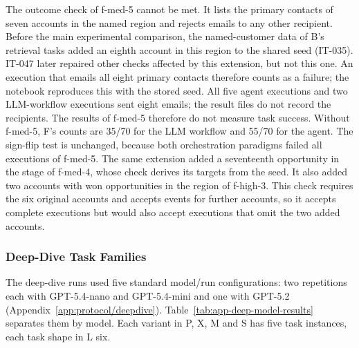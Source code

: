 The outcome check of f-med-5 cannot be met. It lists the primary contacts of seven accounts in the named region and rejects emails to any other recipient. Before the main experimental comparison, the named-customer data of B's retrieval tasks added an eighth account in this region to the shared seed (IT-035). IT-047 later repaired other checks affected by this extension, but not this one. An execution that emails all eight primary contacts therefore counts as a failure; the notebook reproduces this with the stored seed. All five agent executions and two LLM-workflow executions sent eight emails; the result files do not record the recipients. The results of f-med-5 therefore do not measure task success. Without f-med-5, F's counts are 35/70 for the LLM workflow and 55/70 for the agent. The sign-flip test is unchanged, because both orchestration paradigms failed all executions of f-med-5. The same extension added a seventeenth opportunity in the stage of f-med-4, whose check derives its targets from the seed. It also added two accounts with won opportunities in the region of f-high-3. This check requires the six original accounts and accepts events for further accounts, so it accepts complete executions but would also accept executions that omit the two added accounts.
\FloatBarrier

\subsubsection{Deep-Dive Task Families}
\label{app:results/deepdive}

The deep-dive runs used five standard model/run configurations: two repetitions each with GPT-5.4-nano and GPT-5.4-mini and one with GPT-5.2 (Appendix~\ref{app:protocol/deepdive}). Table~\ref{tab:app-deep-model-results} separates them by model. Each variant in P, X, M and S has five task instances, each task shape in L six.

